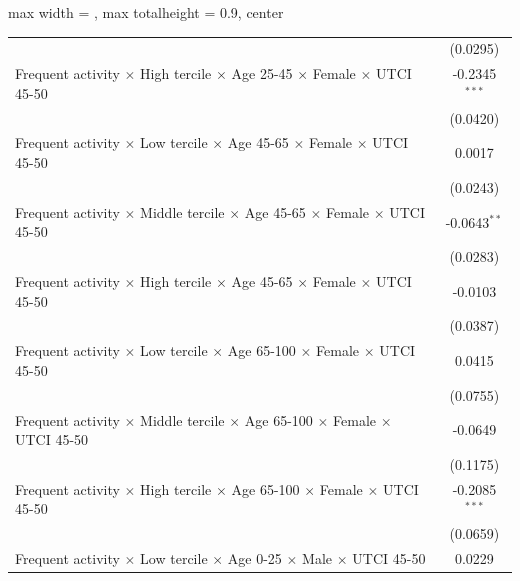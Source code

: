 \begin{table}[htbp]
\begin{adjustbox}{max width = \textwidth, max totalheight = 0.9\textheight, center}
\begin{tabular}{lc}
                                                                                                               & (0.0295)\\   
         Frequent activity $\times$ High tercile $\times$ Age 25-45 $\times$ Female $\times$ UTCI 45-50        & -0.2345$^{***}$\\   
                                                                                                               & (0.0420)\\   
         Frequent activity $\times$ Low tercile $\times$ Age 45-65 $\times$ Female $\times$ UTCI 45-50         & 0.0017\\   
                                                                                                               & (0.0243)\\   
         Frequent activity $\times$ Middle tercile $\times$ Age 45-65 $\times$ Female $\times$ UTCI 45-50      & -0.0643$^{**}$\\   
                                                                                                               & (0.0283)\\   
         Frequent activity $\times$ High tercile $\times$ Age 45-65 $\times$ Female $\times$ UTCI 45-50        & -0.0103\\   
                                                                                                               & (0.0387)\\   
         Frequent activity $\times$ Low tercile $\times$ Age 65-100 $\times$ Female $\times$ UTCI 45-50        & 0.0415\\   
                                                                                                               & (0.0755)\\   
         Frequent activity $\times$ Middle tercile $\times$ Age 65-100 $\times$ Female $\times$ UTCI 45-50     & -0.0649\\   
                                                                                                               & (0.1175)\\   
         Frequent activity $\times$ High tercile $\times$ Age 65-100 $\times$ Female $\times$ UTCI 45-50       & -0.2085$^{***}$\\   
                                                                                                               & (0.0659)\\   
         Frequent activity $\times$ Low tercile $\times$ Age 0-25 $\times$ Male $\times$ UTCI 45-50            & 0.0229\\   

\end{tabular}
\end{adjustbox}
\end{table}
